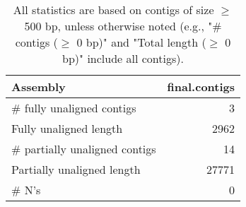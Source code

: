 \documentclass[12pt,a4paper]{article}
\begin{document}
\begin{table}[ht]
\begin{center}
\caption{All statistics are based on contigs of size $\geq$ 500 bp, unless otherwise noted (e.g., "\# contigs ($\geq$ 0 bp)" and "Total length ($\geq$ 0 bp)" include all contigs).}
\begin{tabular}{|l*{1}{|r}|}
\hline
Assembly & final.contigs \\ \hline
\# fully unaligned contigs & 3 \\ \hline
Fully unaligned length & 2962 \\ \hline
\# partially unaligned contigs & 14 \\ \hline
Partially unaligned length & 27771 \\ \hline
\# N's & 0 \\ \hline
\end{tabular}
\end{center}
\end{table}
\end{document}
